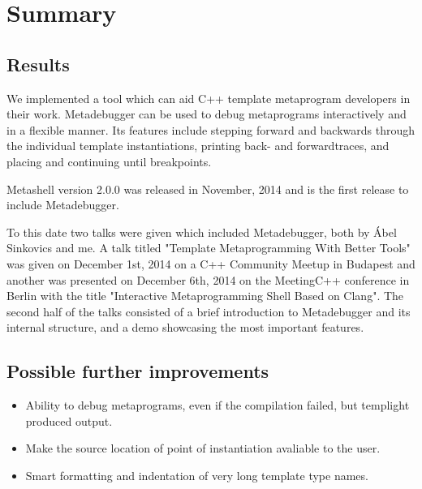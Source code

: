 
\chapter{Summary} \label{summary}

\section{Results}

We implemented a tool which can aid C++ template metaprogram developers in
their work. Metadebugger can be used to debug metaprograms interactively and in
a flexible manner. Its features include stepping forward and backwards through
the individual template instantiations, printing back- and forwardtraces,
and placing and continuing until breakpoints.

Metashell version 2.0.0 was released in November, 2014\cite{github-releases}
and is the first release to include Metadebugger.

To this date two talks were given which included Metadebugger, both by Ábel
Sinkovics and me. A talk titled "Template Metaprogramming With Better Tools"
was given on December 1st, 2014 on a C++ Community Meetup in
Budapest\cite{cpp-meetup} and another was presented on December 6th, 2014 on
the MeetingC++ conference in Berlin with the title "Interactive Metaprogramming
Shell Based on Clang"\cite{meeting-cpp}. The second half of the talks consisted
of a brief introduction to Metadebugger and its internal structure, and a demo
showcasing the most important features.

\section{Possible further improvements}

\begin{itemize}
    \item
        Ability to debug metaprograms, even if the compilation failed, but
        templight produced output.
    \item
        Make the source location of point of instantiation avaliable to the
        user.
    \item
        Smart formatting and indentation of very long template type names.
\end{itemize}
